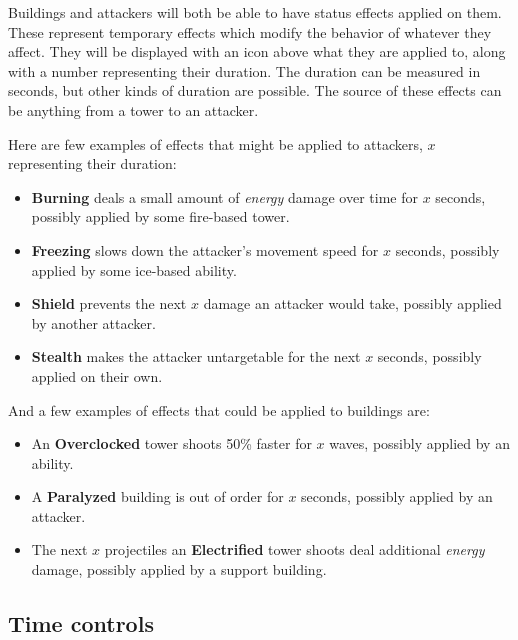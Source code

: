 \begin{notindemo}
    Buildings and attackers will both be able to have status effects applied on them.
    These represent temporary effects which modify the behavior of whatever they affect.
    They will be displayed with an icon above what they are applied to, along with a number representing their duration.
    The duration can be measured in seconds, but other kinds of duration are possible.
    The source of these effects can be anything from a tower to an attacker.

    Here are few examples of effects that might be applied to attackers, $x$ representing their duration:
    \begin{itemize}
        \item \textbf{Burning} deals a small amount of \emph{energy} damage over time for $x$ seconds, possibly applied by some fire-based tower.
        \item \textbf{Freezing} slows down the attacker's movement speed for $x$ seconds, possibly applied by some ice-based ability.
        \item \textbf{Shield} prevents the next $x$ damage an attacker would take, possibly applied by another attacker.
        \item \textbf{Stealth} makes the attacker untargetable for the next $x$ seconds, possibly applied on their own.
    \end{itemize}

    And a few examples of effects that could be applied to buildings are:
    \begin{itemize}
        \item An \textbf{Overclocked} tower shoots 50\% faster for $x$ waves, possibly applied by an ability.
        \item A \textbf{Paralyzed} building is out of order for $x$ seconds, possibly applied by an attacker.
        \item The next $x$ projectiles an \textbf{Electrified} tower shoots deal additional \emph{energy} damage, possibly applied by a support building.
    \end{itemize}
\end{notindemo}

\subsection{Time controls}

